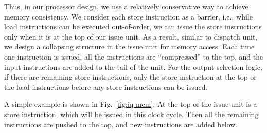 Thus, in our processor design, we use a relatively conservative way to achieve memory consistency. We consider each store instruction as a barrier, i.e., while load instructions can be executed out-of-order, we can issue the store instructions only when it is at the top of our issue unit. As a result, similar to dispatch unit, we design a collapsing structure in the issue unit for memory access. Each time one instruction is issued, all the instructions are ``compressed'' to the top, and the input instructions are added to the tail of the unit. For the output selection logic, if there are remaining store instructions, only the store instruction at the top or the load instructions before any store instructions can be issued.

A simple example is shown in Fig.~\ref{fig:iq-mem}. At the top of the issue unit is a store instruction, which will be issued in this clock cycle. Then all the remaining instructions are pushed to the top, and new instructions are added below.


